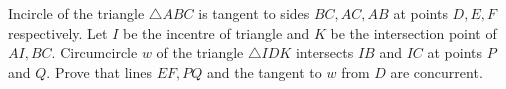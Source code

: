 Incircle of the triangle $\triangle ABC$ is tangent to sides $BC, AC, AB$ at points $D, E, F$ respectively. Let $I$ be the incentre of triangle and $K$ be the intersection point of $AI, BC.$ Circumcircle $w$ of the triangle $\triangle IDK$ intersects $IB$ and $IC$ at points $P$ and $Q.$ Prove that lines $EF, PQ$ and the tangent to $w$ from $D$ are concurrent.